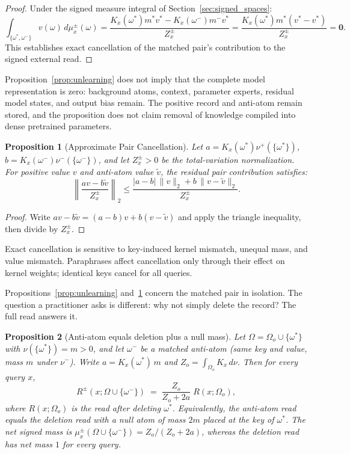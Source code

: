\documentclass[preprint,12pt]{elsarticle}
\newtheorem{proposition}{Proposition}
\newcommand{\Om}{\Omega}
\newif\ifmarkchanges
\newcommand{\rev}[1]{#1}
\newcommand{\revii}[1]{\ifmarkchanges{\color{blue}#1}\else#1\fi}
\begin{document}
\begin{proof}
Under the signed measure integral of Section~\ref{sec:signed_spaces}:
\[
  \int_{\{\omega^*, \omega^-\}} v(\omega)\, d\mu_x^{\pm}(\omega) = \frac{K_x(\omega^*) m^* v^* - K_x(\omega^-) m^- v^*}{Z_x^{\pm}} = \frac{K_x(\omega^*) m^* (v^* - v^*)}{Z_x^{\pm}} = \mathbf{0}.
\]
This establishes exact cancellation of the matched pair's contribution to the signed external read. \qedhere
\end{proof}

Proposition~\ref{prop:unlearning} does not imply that the complete model representation is zero: background atoms, context, parameter experts, residual model states, and output bias remain. The positive record and anti-atom remain stored, and the proposition does not claim removal of knowledge compiled into dense pretrained parameters.

\begin{proposition}[Approximate Pair Cancellation]
\label{prop:approximate_cancellation}
Let $a=K_x(\omega^*)\nu^+(\{\omega^*\})$, $b=K_x(\omega^-)\nu^-(\{\omega^-\})$, and let $Z_x^{\pm}>0$ be the total-variation normalization. For positive value $v$ and anti-atom value $\tilde v$, the residual pair contribution satisfies:
\[
  \left\|\frac{a v-b\tilde v}{Z_x^{\pm}}\right\|_2
  \le \frac{|a-b|\,\|v\|_2+b\,\|v-\tilde v\|_2}{Z_x^{\pm}}.
\]
\end{proposition}

\begin{proof}
Write $a v-b\tilde v=(a-b)v+b(v-\tilde v)$ and apply the triangle inequality, then divide by $Z_x^{\pm}$. \qedhere
\end{proof}

Exact cancellation is sensitive to key-induced kernel mismatch, unequal mass, and value mismatch. Paraphrases affect cancellation only through their effect on kernel weights; identical keys cancel for all queries.

\rev{Propositions~\ref{prop:unlearning} and~\ref{prop:approximate_cancellation} concern the matched pair in isolation. The question a practitioner asks is different: why not simply delete the record? The full read answers it.}

\begin{proposition}[Anti-atom equals deletion plus a null mass]
\label{prop:anti_vs_delete}
\rev{Let $\Om=\Om_o\cup\{\omega^*\}$ with $\nu(\{\omega^*\})=m>0$, and let $\omega^-$ be a matched anti-atom (same key and value, mass $m$ under $\nu^-$). Write $a=K_x(\omega^*)\,m$ and $Z_o=\int_{\Om_o}K_x\,d\nu$. Then for every query $x$,
\[
  R^{\pm}(x;\Om\cup\{\omega^-\}) \;=\; \frac{Z_o}{Z_o+2a}\;R(x;\Om_o),
\]
where $R(x;\Om_o)$ is the read after deleting $\omega^*$. Equivalently, the anti-atom read equals the deletion read with a null atom of mass $2m$ placed at the key of $\omega^*$.} \revii{The net signed mass is $\mu_x^{\pm}(\Om\cup\{\omega^-\})=Z_o/(Z_o+2a)$, whereas the deletion read has net mass $1$ for every query.}
\end{proposition}
\end{document}
